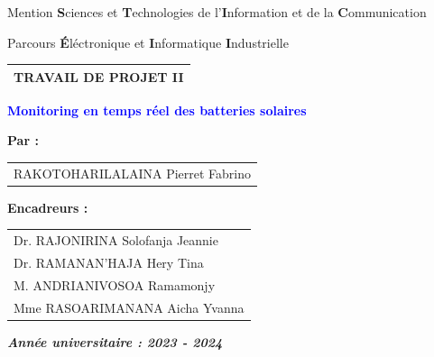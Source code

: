 \begin{titlepage}
	\begin{center}
		\begin{large}
			\large Mention {\textbf{S}ciences et \textbf{T}echnologies de l'\textbf{I}nformation et de la \textbf{C}ommunication} \\
		\end{large}
	\end{center}
	
	\begin{center}
		\begin{large}
			\large Parcours {\textbf{É}léctronique et \textbf{I}nformatique} \textbf{I}ndustrielle\\
		\end{large}
	\end{center}
	
	\vfill
	\begin{center}
		\begin{center}
			\begin{tabular}{c}
				
				
				\textbf{\small{TRAVAIL DE PROJET II}} \\
				\hline \hline
			\end{tabular}
		\end{center}
	\end{center}
	
	\vfill
	\begin{center}
		\textcolor{blue}{\Huge{\textbf{Monitoring en temps réel des batteries solaires}}} \\
	\end{center}
	
	\vfill
	\begin{center}		
		\textbf{Par :}
	\end{center}
	
	\begin{center}
		\begin{tabular}{l}
			RAKOTOHARILALAINA Pierret Fabrino
		\end{tabular}
	\end{center}
	\vfill
	\begin{center}
		\textbf{Encadreurs :} \\
	\end{center}
	
	\begin{center}
		\begin{tabular}{l}
			Dr. RAJONIRINA Solofanja Jeannie\\
			Dr. RAMANAN'HAJA Hery Tina\\	
			M. ANDRIANIVOSOA Ramamonjy\\
			Mme RASOARIMANANA Aicha Yvanna
		\end{tabular}
	\end{center}
	
	
	\vfill
	\begin{center}
		\emph{\textbf{Année universitaire : 2023 -  2024}}
	\end{center}
\end{titlepage}